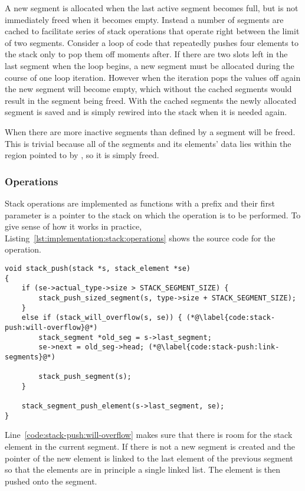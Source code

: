 A new segment is allocated when the last active segment becomes full, but is not
immediately freed when it becomes empty. Instead a number of segments are cached
to facilitate series of stack operations that operate right between the limit of
two segments. Consider a loop of code that repeatedly pushes four elements to
the stack only to pop them off moments after. If there are two slots left in the
last segment when the loop begins, a new segment must be allocated during the
course of one loop iteration. However when the iteration pops the values off
again the new segment will become empty, which without the cached segments would
result in the segment being freed. With the cached segments the newly allocated
segment is saved and is simply rewired into the stack when it is needed again.

When there are more inactive segments than defined by
 a segment will be freed. This is trivial
because all of the segments and its elements' data lies within the region
pointed to by , so it is simply freed.

\subsubsection{Operations}

Stack operations are implemented as functions with a  prefix and
their first parameter is a pointer to the stack on which the operation is to be
performed. To give sense of how it works in practice,
Listing~\ref{lst:implementation:stack:operations} shows the source code for the
 operation.

\begin{minipage}{\linewidth}
\begin{lstlisting}[language={[ANSI]C},
  caption={Source code of the \code{push} stack operation},
  label={lst:implementation:stack:operations}]
void stack_push(stack *s, stack_element *se)
{
    if (se->actual_type->size > STACK_SEGMENT_SIZE) {
        stack_push_sized_segment(s, type->size + STACK_SEGMENT_SIZE);
    }
    else if (stack_will_overflow(s, se)) { (*@\label{code:stack-push:will-overflow}@*)
        stack_segment *old_seg = s->last_segment;
        se->next = old_seg->head; (*@\label{code:stack-push:link-segments}@*)

        stack_push_segment(s);
    }

    stack_segment_push_element(s->last_segment, se);
}
\end{lstlisting}
\end{minipage}

Line~\ref{code:stack-push:will-overflow} makes sure that there is room for the
stack element in the current segment. If there is not a new segment is created
and the  pointer of the new element is linked to the last element of
the previous segment so that the elements are in principle a single linked
list. The element is then pushed onto the segment.

